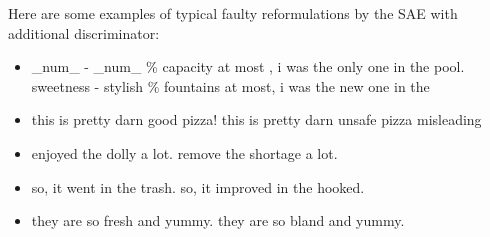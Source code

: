 \documentclass[11pt,a4paper]{article}
\begin{document}
Here are some examples of typical faulty reformulations by the SAE with additional discriminator:
\begin{itemize}
\item \_num\_ - \_num\_ \% capacity at most , i was the only one in the pool.  sweetness - stylish \% fountains at most, i was the new one in the
\item this is pretty darn good pizza!  this is pretty darn unsafe pizza misleading
\item enjoyed the dolly a lot.  remove the shortage a lot.
\item so, it went in the trash.  so, it improved in the hooked.
\item they are so fresh and yummy.  they are so bland and yummy.
\end{itemize}
\end{document}
